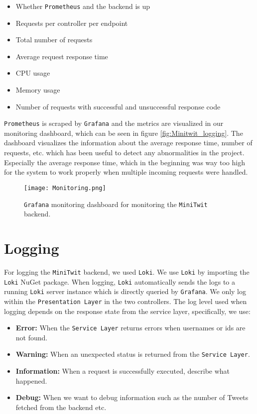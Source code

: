 \begin{itemize}
    \item Whether \texttt{Prometheus} and the backend is up
    \item Requests per controller per endpoint
    \item Total number of requests
    \item Average request response time
    \item CPU usage
    \item Memory usage
    \item Number of requests with successful and unsuccessful response code
\end{itemize}

\texttt{Prometheus} is scraped by \texttt{Grafana} and the metrics are visualized in our monitoring dashboard, which can be seen in figure \ref{fig:Minitwit_logging}. The dashboard visualizes the information about the average response time, number of requests, etc. which has been useful to detect any abnormalities in the project. Especially the average response time, which in the beginning was way too high for the system to work properly when multiple incoming requests were handled.

\begin{figure}[H]
    \centering
    \texttt{[image: Monitoring.png]}
    \caption{\texttt{Grafana} monitoring dashboard for monitoring the \texttt{MiniTwit} backend.}
    \label{fig:Minitwit_monitoring}
\end{figure}

\section{Logging}

For logging the \texttt{MiniTwit} backend, we used \texttt{Loki}. We use \texttt{Loki} by importing the \texttt{Loki} NuGet package. When logging, \texttt{Loki} automatically sends the logs to a running \texttt{Loki} server instance which is directly queried by \texttt{Grafana}. We only log within the \texttt{Presentation Layer} in the two controllers. The log level used when logging depends on the response state from the service layer, specifically, we use:

\begin{itemize}
    \item \textbf{Error:} When the \texttt{Service Layer} returns errors when usernames or ids are not found.
    \item \textbf{Warning:} When an unexpected status is returned from the \texttt{Service Layer}.
    \item \textbf{Information:} When a request is successfully executed, describe what happened.
    \item \textbf{Debug:} When we want to debug information such as the number of Tweets fetched from the backend etc.
\end{itemize}

